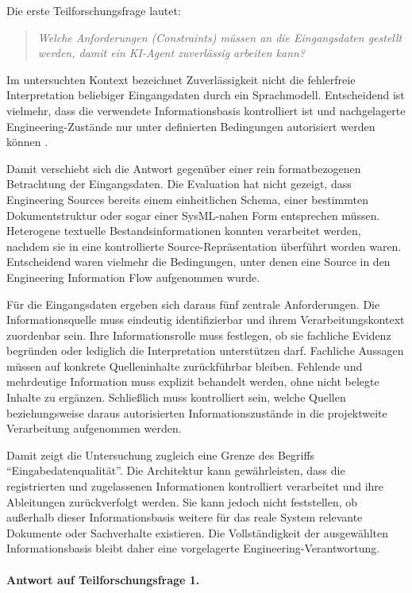 Die erste Teilforschungsfrage lautet:

\begin{quote}
\textit{Welche Anforderungen (Constraints) müssen an die Eingangsdaten gestellt
werden, damit ein KI-Agent zuverlässig arbeiten kann?}
\end{quote}

Im untersuchten Kontext bezeichnet Zuverlässigkeit nicht die fehlerfreie
Interpretation beliebiger Eingangsdaten durch ein Sprachmodell. Entscheidend
ist vielmehr, dass die verwendete Informationsbasis kontrolliert ist und
nachgelagerte Engineering-Zustände nur unter definierten Bedingungen
autorisiert werden können \cite{Topcu2025}.

Damit verschiebt sich die Antwort gegenüber einer rein formatbezogenen
Betrachtung der Eingangsdaten. Die Evaluation hat nicht gezeigt, dass
Engineering Sources bereits einem einheitlichen Schema, einer bestimmten
Dokumentstruktur oder sogar einer SysML-nahen Form entsprechen müssen.
Heterogene textuelle Bestandsinformationen konnten verarbeitet werden, nachdem
sie in eine kontrollierte Source-Repräsentation überführt worden waren.
Entscheidend waren vielmehr die Bedingungen, unter denen eine Source in den
Engineering Information Flow aufgenommen wurde.

Für die Eingangsdaten ergeben sich daraus fünf zentrale Anforderungen. Die
Informationsquelle muss eindeutig identifizierbar und ihrem
Verarbeitungskontext zuordenbar sein. Ihre Informationsrolle muss festlegen,
ob sie fachliche Evidenz begründen oder lediglich die Interpretation
unterstützen darf. Fachliche Aussagen müssen auf konkrete Quelleninhalte
zurückführbar bleiben. Fehlende und mehrdeutige Information muss explizit
behandelt werden, ohne nicht belegte Inhalte zu ergänzen. Schließlich muss
kontrolliert sein, welche Quellen beziehungsweise daraus autorisierten
Informationszustände in die projektweite Verarbeitung aufgenommen werden.

Damit zeigt die Untersuchung zugleich eine Grenze des Begriffs
``Eingabedatenqualität''. Die Architektur kann gewährleisten, dass die
registrierten und zugelassenen Informationen kontrolliert verarbeitet und
ihre Ableitungen zurückverfolgt werden. Sie kann jedoch nicht feststellen,
ob außerhalb dieser Informationsbasis weitere für das reale System relevante
Dokumente oder Sachverhalte existieren. Die Vollständigkeit der ausgewählten
Informationsbasis bleibt daher eine vorgelagerte Engineering-Verantwortung.

\paragraph{Antwort auf Teilforschungsfrage 1.}

